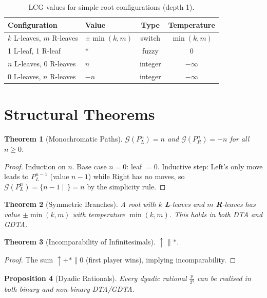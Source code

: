 \documentclass[10pt,a4paper,twocolumn]{article}
\newcommand{\Lopt}[1]{{\color{lblue}\textbf{#1}}}
\newcommand{\Ropt}[1]{{\color{rred}\textbf{#1}}}
\newcommand{\Gv}[1]{\mathcal{G}(#1)}
\theoremstyle{plain}
\newtheorem{theorem}{Theorem}[section]
\newtheorem{proposition}[theorem]{Proposition}
\theoremstyle{definition}
\theoremstyle{remark}
\begin{document}
\begin{table}[ht]
\centering
\small
\begin{tabular}{@{}p{3.5cm}lcc@{}}
\toprule
Configuration & Value & Type & Temperature \\
\midrule
$k$ L-leaves, $m$ R-leaves & $\pm\min(k,m)$ & switch & $\min(k,m)$ \\
1 L-leaf, 1 R-leaf & $*$ & fuzzy & $0$ \\
$n$ L-leaves, 0 R-leaves & $n$ & integer & $-\infty$ \\
0 L-leaves, $n$ R-leaves & $-n$ & integer & $-\infty$ \\
\bottomrule
\end{tabular}
\caption{LCG values for simple root configurations (depth 1).}
\end{table}

\section{Structural Theorems}

\begin{theorem}[Monochromatic Paths]
\(\Gv{P^n_L} = n\) and \(\Gv{P^n_R} = -n\) for all \(n\ge 0\).
\end{theorem}

\begin{proof}
Induction on \(n\). Base case \(n=0\): leaf \(=0\). Inductive step: Left’s only move leads to \(P^{n-1}_L\) (value \(n-1\)) while Right has no moves, so \(\Gv{P^n_L} = \{n-1\mid\,\} = n\) by the simplicity rule.
\end{proof}

\begin{theorem}[Symmetric Branches]
A root with \(k\) \Lopt{L}-leaves and \(m\) \Ropt{R}-leaves has value \(\pm\min(k,m)\) with temperature \(\min(k,m)\). This holds in both DTA and GDTA.
\end{theorem}

\begin{theorem}[Incomparability of Infinitesimals]
\(\uparrow \parallel *\).
\end{theorem}

\begin{proof}
The sum \(\uparrow + * \parallel 0\) (first player wins), implying incomparability.
\end{proof}

\begin{proposition}[Dyadic Rationals]
Every dyadic rational \(\frac{p}{2^q}\) can be realised in both binary and non-binary DTA/GDTA.
\end{proposition}
\end{document}
